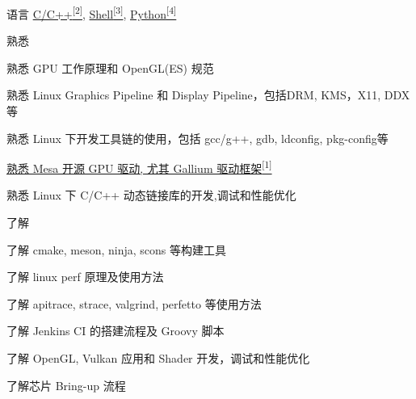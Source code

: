 
\begin{cvskills}
  \cvskill
    {语言} %
    {\hyperlink{cpp-proj}{C/C++\textsuperscript{[2]}}, \hyperlink{shell-proj}{Shell\textsuperscript{[3]}}, \hyperlink{python-proj}{Python\textsuperscript{[4]}}} %
\end{cvskills}

\begin{cventries}
  \cventry
    {} %
    {熟悉} %
    {} %
    {} %
    {
      \begin{cvitems} %
        \item {熟悉 GPU 工作原理和 OpenGL(ES) 规范}
        \item {熟悉 Linux Graphics Pipeline 和 Display Pipeline，包括DRM, KMS，X11, DDX等}
        \item {熟悉 Linux 下开发工具链的使用，包括 gcc/g++, gdb, ldconfig, pkg-config等}
        \item {\hyperlink{mesa-mr}{熟悉 Mesa 开源 GPU 驱动, 尤其 Gallium 驱动框架\textsuperscript{[1]}}}
        \item {熟悉 Linux 下 C/C++ 动态链接库的开发,调试和性能优化}
      \end{cvitems}
    }
  \cventry
    {} %
    {了解} %
    {} %
    {} %
    {
      \begin{cvitems} %
        \item {了解 cmake, meson, ninja, scons 等构建工具}
        \item {了解 linux perf 原理及使用方法}
        \item {了解 apitrace, strace, valgrind, perfetto 等使用方法}
        \item {了解 Jenkins CI 的搭建流程及 Groovy 脚本}
        \item {了解 OpenGL, Vulkan 应用和 Shader 开发，调试和性能优化}
        \item {了解芯片 Bring-up 流程}
      \end{cvitems}
    }
\end{cventries}
